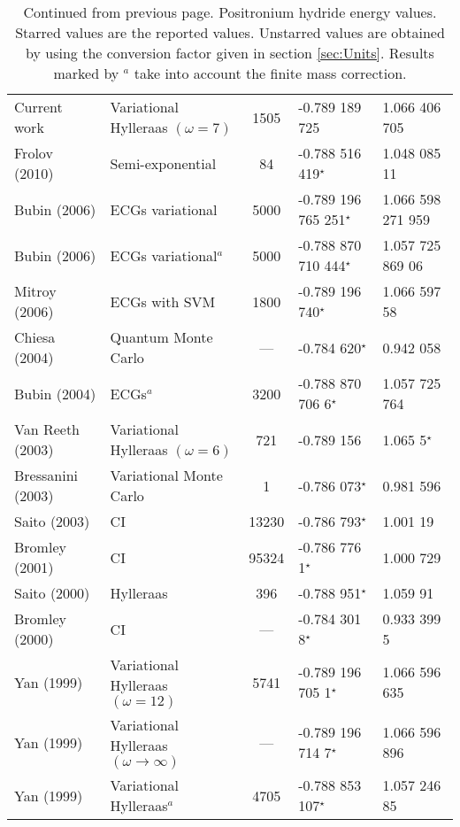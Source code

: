 \documentclass[Dissertation.tex]{subfiles}
\begin{document}
\begin{center}
\begin{longtable}{l l c l l}
\caption[Positronium hydride energy values]{Continued from previous page. Positronium hydride energy values. Starred values are the reported values. Unstarred values are obtained by using the conversion factor given in section \ref{sec:Units}. Results marked by $^a$ take into account the finite mass correction.}
\endlastfoot
\rowcolors{2}{gray!15}{white}
Current work & Variational Hylleraas $(\omega = 7)$ & 1505 & -0.789 189 725 & 1.066 406 705 \\
Frolov (2010) \cite{Frolov2010} & Semi-exponential & 84 & -0.788 516 419$^\star$ & 1.048 085 11 \\
Bubin (2006) \cite{Bubin2006} & ECGs variational & 5000 & -0.789 196 765 251$^\star$ & 1.066 598 271 959 \\
Bubin (2006) \cite{Bubin2006} & ECGs variational$^a$ & 5000 & -0.788 870 710 444$^\star$ & 1.057 725 869 06 \\
Mitroy (2006) \cite{Mitroy2006} & ECGs with SVM & 1800 & -0.789 196 740$^\star$ & 1.066 597 58 \\
Chiesa (2004) \cite{Chiesa2004} & Quantum Monte Carlo & --- & -0.784 620$^\star$ & 0.942 058 \\
Bubin (2004) \cite{Bubin2004} & ECGs$^a$ & 3200 & -0.788 870 706 6$^\star$ & 1.057 725 764 \\
Van Reeth (2003) \cite{VanReeth2003} & Variational Hylleraas $(\omega = 6)$ & 721 & -0.789 156 & 1.065 5$^\star$ \\
Bressanini (2003) \cite{Bressanini2003} & Variational Monte Carlo & 1 & -0.786 073$^\star$ & 0.981 596 \\
Saito (2003) \cite{Saito2003a} & CI & 13230 & -0.786 793$^\star$ & 1.001 19 \\
Bromley (2001) \cite{Bromley2001} & CI & 95324 & -0.786 776 1$^\star$ & 1.000 729 \\
Saito (2000) \cite{Saito2000} & Hylleraas & 396 & -0.788 951$^\star$ & 1.059 91 \\
Bromley (2000) \cite{Bromley2000} & CI & --- & -0.784 301 8$^\star$ & 0.933 399 5 \\
Yan (1999) \cite{Yan1999} & Variational Hylleraas $(\omega = 12)$ & 5741 & -0.789 196 705 1$^\star$ & 1.066 596 635 \\
Yan (1999) \cite{Yan1999} & Variational Hylleraas $(\omega \rightarrow \infty)$ & --- & -0.789 196 714 7$^\star$ & 1.066 596 896 \\
Yan (1999) \cite{Yan1999a} & Variational Hylleraas$^a$ & 4705 & -0.788 853 107$^\star$ & 1.057 246 85 \\

\end{longtable}
\end{center}
\end{document}
